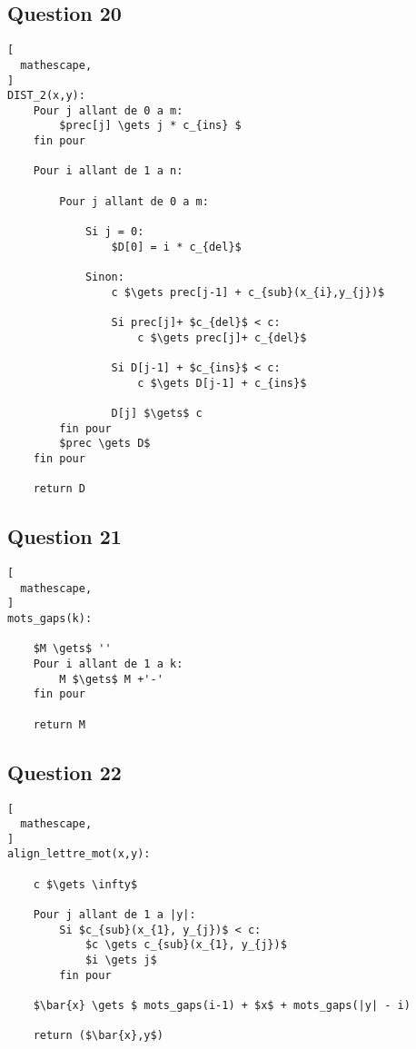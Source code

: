 \documentclass{report}
\begin{document}
\subsection*{Question 20}
\begin{lstlisting}[
  mathescape,
]
DIST_2(x,y):
    Pour j allant de 0 a m:
        $prec[j] \gets j * c_{ins} $
    fin pour
    
    Pour i allant de 1 a n:
    
        Pour j allant de 0 a m:
        
            Si j = 0:
                $D[0] = i * c_{del}$
                
            Sinon:
                c $\gets prec[j-1] + c_{sub}(x_{i},y_{j})$
                    
                Si prec[j]+ $c_{del}$ < c:
                    c $\gets prec[j]+ c_{del}$

                Si D[j-1] + $c_{ins}$ < c:
                    c $\gets D[j-1] + c_{ins}$
                        
                D[j] $\gets$ c
        fin pour
        $prec \gets D$
    fin pour
    
    return D

\end{lstlisting}

\clearpage

\subsection*{Question 21}
\begin{lstlisting}[
  mathescape,
]
mots_gaps(k):

    $M \gets$ ''
    Pour i allant de 1 a k:
        M $\gets$ M +'-'
    fin pour

    return M
\end{lstlisting}

\subsection*{Question 22}
\begin{lstlisting}[
  mathescape,
]
align_lettre_mot(x,y):

    c $\gets \infty$
    
    Pour j allant de 1 a |y|:
        Si $c_{sub}(x_{1}, y_{j})$ < c:
            $c \gets c_{sub}(x_{1}, y_{j})$
            $i \gets j$
        fin pour
        
    $\bar{x} \gets $ mots_gaps(i-1) + $x$ + mots_gaps(|y| - i)
    
    return ($\bar{x},y$)

\end{lstlisting}
\end{document}
